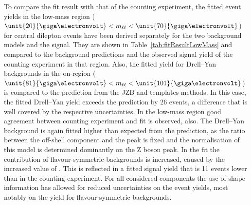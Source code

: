 To compare the fit result with that of the counting experiment, the fitted event yields in the low-mass region ($\unit{20}{\giga\electronvolt} < \mll < \unit{70}{\giga\electronvolt}$) for central dilepton events have been derived separately for the two background models and the signal. They are shown in Table~\ref{tab:fitResultLowMass} and compared to the background predictions and the observed signal yield of the counting experiment in that region. Also, the fitted yield for Drell--Yan backgrounds  in the on-\Z region ($\unit{81}{\giga\electronvolt} < \mll < \unit{101}{\giga\electronvolt}$) is compared to the prediction from the JZB and \MET templates methods. In this case, the fitted Drell--Yan yield exceeds the prediction by 26 events, a difference that is well covered by the respective uncertainties. In the low-mass region good agreement between counting experiment and fit is observed, also. The Drell--Yan background is again fitted higher than expected from the prediction, as the ratio between the off-shell component and the peak is fixed and the normalisation of this model is determined dominantly on the Z boson peak. In the fit the contribution of flavour-symmetric backgrounds is increased, caused by the increased value of \Rsfof. This is reflected in a fitted signal yield that is 11 events lower than in the counting experiment. For all considered components the use of shape information has allowed for reduced uncertainties on the event yields, most notably on the yield for flavour-symmetric backgrounds. 

